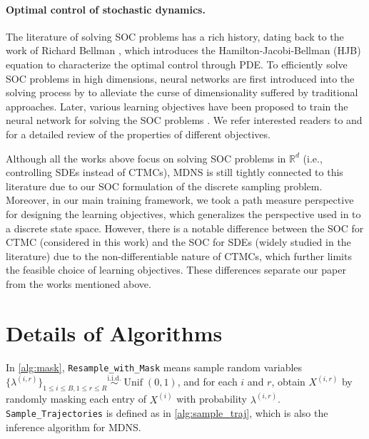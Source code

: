 \documentclass{article}
\theoremstyle{remark}
\newcommand{\iid}{\stackrel{\mathrm{i.i.d.}}{\sim}}
\newcommand{\R}{\mathbb{R}}
\newcommand{\unif}{\operatorname{Unif}}
\begin{document}
\paragraph{Optimal control of stochastic dynamics.} The literature of solving SOC problems has a rich history, dating back to the work of Richard Bellman \cite{bellman1966dynamic}, which introduces the Hamilton-Jacobi-Bellman (HJB) equation to characterize the optimal control through PDE. To efficiently solve SOC problems in high dimensions, neural networks are first introduced into the solving process by \cite{e2017deep, han2018solving} to alleviate the curse of dimensionality suffered by traditional approaches. Later, various learning objectives have been proposed to train the neural network for solving the SOC problems \cite{domingoenrich2025adjoint, hua2024simulation}. We refer interested readers to \cite{nusken2021solving} and \cite{domingoenrich2024taxonomy} for a detailed review of the properties of different objectives.

Although all the works above focus on solving SOC problems in $\R^d$ (i.e., controlling SDEs instead of CTMCs), MDNS is still tightly connected to this literature due to our SOC formulation of the discrete sampling problem. Moreover, in our main training framework, we took a path measure perspective for designing the learning objectives, which generalizes the perspective used in \cite{nusken2021solving} to a discrete state space. However, there is a notable difference between the SOC for CTMC (considered in this work) and the SOC for SDEs (widely studied in the literature) due to the non-differentiable nature of CTMCs, which further limits the feasible choice of learning objectives. These differences separate our paper from the works mentioned above.


\section{Details of Algorithms}
\label{app:alg}
In \cref{alg:mask}, \texttt{Resample\_with\_Mask} means sample random variables $\{\lambda^{(i,r)}\}_{1\le i\le B,1\le r\le R}\iid\unif(0,1)$, and for each $i$ and $r$, obtain $X^{(i,r)}$ by randomly masking each entry of $X^{(i)}$ with probability $\lambda^{(i,r)}$. \texttt{Sample\_Trajectories} is defined as in \cref{alg:sample_traj}, which is also the inference algorithm for MDNS.
\end{document}

